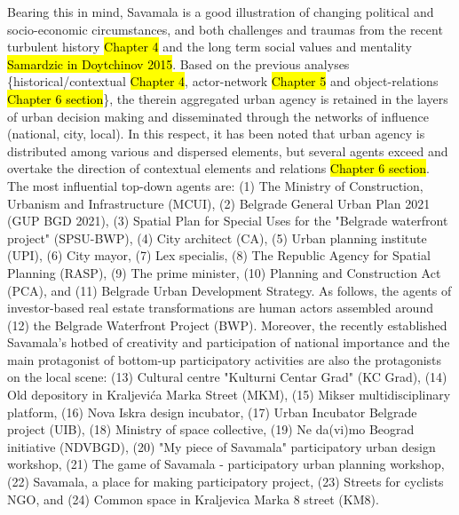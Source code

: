 \documentclass[11pt]{report}
\begin{document}
Bearing this in mind, Savamala is a good illustration of changing political and socio-economic circumstances, and both challenges and  traumas from the recent turbulent history \hl{Chapter 4} and the long term social values and mentality \hl{Samardzic in Doytchinov 2015}.\footnotemark
Based on the previous analyses \{historical/contextual \hl{Chapter 4}, actor-network \hl{Chapter 5} and object-relations \hl{Chapter 6 section}\}, the therein aggregated urban agency is retained in the layers of urban decision making and disseminated through the networks of influence (national, city, local).
In this respect, it has been noted that urban agency is distributed among various and dispersed elements, but several agents exceed and overtake the direction of contextual elements and relations \hl{Chapter 6 section}.
\\
The most influential top-down agents are: 
(1) The Ministry of Construction, Urbanism and Infrastructure (MCUI), 
(2) Belgrade General Urban Plan 2021 (GUP BGD 2021), 
(3) Spatial Plan for Special Uses for the "Belgrade waterfront project" (SPSU-BWP),
(4) City architect (CA),
(5) Urban planning institute (UPI),
(6) City mayor,
(7) Lex specialis,
(8) The Republic Agency for Spatial Planning (RASP),
(9) The prime minister,
(10) Planning and Construction Act (PCA),
and (11) Belgrade Urban Development Strategy.
As follows, the agents of investor-based real estate transformations are human actors assembled around
(12) the Belgrade Waterfront Project (BWP). Moreover, the recently established Savamala's hotbed of creativity and participation of national importance and the main protagonist of bottom-up participatory activities are also the protagonists on the local scene: 
(13) Cultural centre "Kulturni Centar Grad" (KC Grad),
(14) Old depository in Kraljevića Marka Street (MKM),
(15) Mikser multidisciplinary platform,
(16) Nova Iskra design incubator,
(17) Urban Incubator Belgrade project (UIB),
(18) Ministry of space collective,
(19) Ne da(vi)mo Beograd initiative (NDVBGD),
(20) "My piece of Savamala" participatory urban design workshop,
(21) The game of Savamala - participatory urban planning workshop,
(22) Savamala, a place for making participatory project,
(23) Streets for cyclists NGO,
and (24) Common space in Kraljevica Marka 8 street (KM8).
\end{document}
